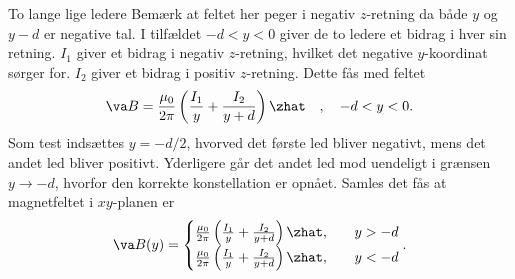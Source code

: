 \begin{opgave}{To lange lige ledere}
    Bemærk at feltet her peger i negativ $z$-retning da både $y$ og $y-d$ er negative tal. I tilfældet $-d<y<0$ giver de to ledere et bidrag i hver sin retning. $I_1$ giver et bidrag i negativ $z$-retning, hvilket det negative $y$-koordinat sørger for. $I_2$ giver et bidrag i positiv $z$-retning. Dette fås med feltet
    \begin{align*}
        \va B = \frac{\mu_0}{2\pi}\left(\frac{I_1}{y} + \frac{I_2}{y+d}\right)\zhat \quad , \quad -d < y < 0.
    \end{align*}
    Som test indsættes $y = -d/2$, hvorved det første led bliver negativt, mens det andet led bliver positivt. Yderligere går det andet led mod uendeligt i grænsen $y \rightarrow -d$, hvorfor den korrekte konstellation er opnået. Samles det fås at magnetfeltet i $xy$-planen er
    \begin{align}
        \va B(y) = \begin{cases}
            \frac{\mu_0}{2\pi}\left(\frac{I_1}{y} + \frac{I_2}{y+d}\right)\zhat, \quad &y>-d \\
            \frac{\mu_0}{2\pi}\left(\frac{I_1}{y} + \frac{I_2}{y+d}\right)\zhat, \quad &y<-d
        \end{cases}
        .
    \end{align}
\end{opgave}

